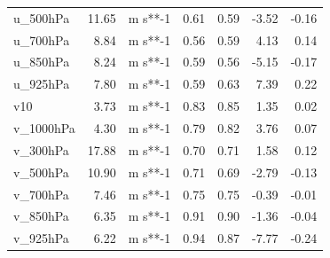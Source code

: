 \begin{longtable}{lrrrrrr}
 u\_500hPa &   11.65 & m s**-1 &         0.61 &           0.59 &        -3.52 &                     -0.16 \\
 u\_700hPa &    8.84 & m s**-1 &         0.56 &           0.59 &         4.13 &                      0.14 \\
 u\_850hPa &    8.24 & m s**-1 &         0.59 &           0.56 &        -5.15 &                     -0.17 \\
 u\_925hPa &    7.80 & m s**-1 &         0.59 &           0.63 &         7.39 &                      0.22 \\
       v10 &    3.73 & m s**-1 &         0.83 &           0.85 &         1.35 &                      0.02 \\
v\_1000hPa &    4.30 & m s**-1 &         0.79 &           0.82 &         3.76 &                      0.07 \\
 v\_300hPa &   17.88 & m s**-1 &         0.70 &           0.71 &         1.58 &                      0.12 \\
 v\_500hPa &   10.90 & m s**-1 &         0.71 &           0.69 &        -2.79 &                     -0.13 \\
 v\_700hPa &    7.46 & m s**-1 &         0.75 &           0.75 &        -0.39 &                     -0.01 \\
 v\_850hPa &    6.35 & m s**-1 &         0.91 &           0.90 &        -1.36 &                     -0.04 \\
 v\_925hPa &    6.22 & m s**-1 &         0.94 &           0.87 &        -7.77 &                     -0.24 \\
\end{longtable}

